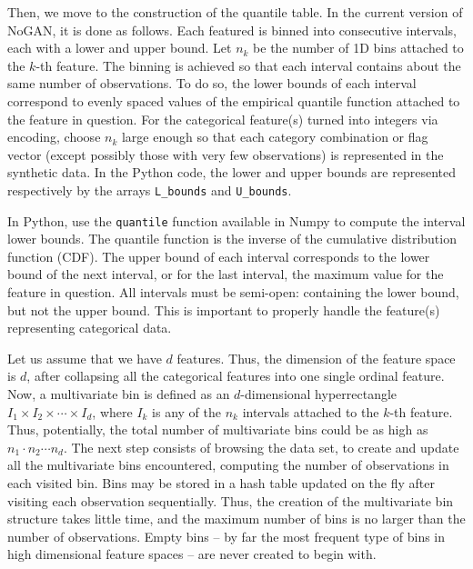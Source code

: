 \documentclass[oneside,10pt]{book}
\begin{document}
\noindent Then, we move to the construction of the \textcolor{index}{quantile} table. In the current version of NoGAN, it is done as follows. Each featured is binned into consecutive intervals, each with a lower and upper bound. Let $n_k$ be the number of 1D bins attached to the $k$-th feature. The binning is achieved so that each interval contains about the same number of observations. To do so, the lower bounds of each interval correspond to evenly spaced values of the empirical \textcolor{index}{quantile function} attached to the feature in question. For the categorical feature(s) turned into integers via encoding, choose $n_k$ large enough so that each category combination or flag vector (except
 possibly those with very few observations) is represented in the synthetic data. In the Python code, the lower and upper bounds are 
 represented respectively by the arrays \texttt{L\_bounds} and \texttt{U\_bounds}. 

In Python,
 use the  \texttt{quantile} function available in Numpy to compute the interval lower bounds. The quantile function  is the inverse of the cumulative distribution function (CDF). The upper bound of each interval corresponds to the lower bound of the next interval, or for the last interval, the maximum value for the feature in question. All intervals must be semi-open: containing the lower bound, but not the upper bound. This is important to properly handle the feature(s) representing categorical data.

Let us assume that we have $d$ features. Thus, the dimension of the feature space is $d$, after collapsing all the categorical features into one single ordinal feature. Now, a multivariate bin is defined as an $d$-dimensional hyperrectangle 
$I_1 \times I_2 \times \cdots\times I_d$, where $I_k$ is any of the $n_k$ intervals attached to the $k$-th feature.
 Thus, potentially, the total number of multivariate bins could be as high as $n_1\cdot n_2 \cdots  n_d$. The next step consists of browsing the data set,
 to create and update all the multivariate bins encountered, computing the number of observations in each visited bin.
 Bins may be stored in a hash table updated on the fly after visiting each observation sequentially. Thus, the creation of the
multivariate  bin structure takes 
 little time, and the maximum number of bins is no larger than the number of observations. Empty bins -- by far the most frequent type of bins in  
  high dimensional feature spaces -- are never created to begin with.
\end{document}
